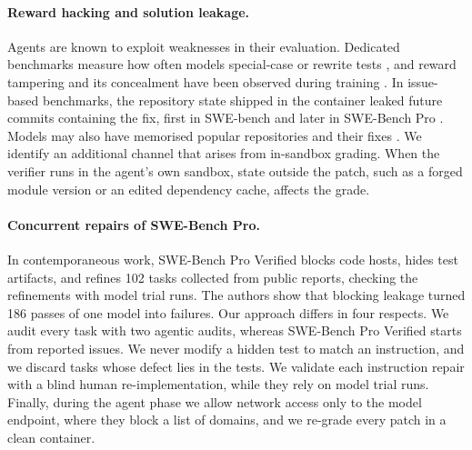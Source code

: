 \paragraph{Reward hacking and solution leakage.} Agents are known to exploit weaknesses in their evaluation. Dedicated benchmarks measure how often models special-case or rewrite tests \citep{zhong2025impossiblebench,gabor2025evilgenie,zhao2026specbench,thaman2026rhb}, and reward tampering and its concealment have been observed during training \citep{denison2024sycophancy,baker2025monitoring}. In issue-based benchmarks, the repository state shipped in the container leaked future commits containing the fix, first in SWE-bench \citep{kahn2025repostate} and later in SWE-Bench Pro \citep{needham2025prostate,adams2026gitreward}. Models may also have memorised popular repositories and their fixes \citep{liang2025swebenchillusion,ramos2024memorization}. We identify an additional channel that arises from in-sandbox grading. When the verifier runs in the agent's own sandbox, state outside the patch, such as a forged module version or an edited dependency cache, affects the grade.

\paragraph{Concurrent repairs of SWE-Bench Pro.} In contemporaneous work, SWE-Bench Pro Verified \citep{swebenchproverified2026} blocks code hosts, hides test artifacts, and refines 102 tasks collected from public reports, checking the refinements with model trial runs. The authors show that blocking leakage turned 186 passes of one model into failures. Our approach differs in four respects. We audit every task with two agentic audits, whereas SWE-Bench Pro Verified starts from reported issues. We never modify a hidden test to match an instruction, and we discard tasks whose defect lies in the tests. We validate each instruction repair with a blind human re-implementation, while they rely on model trial runs. Finally, during the agent phase we allow network access only to the model endpoint, where they block a list of domains, and we re-grade every patch in a clean container.
